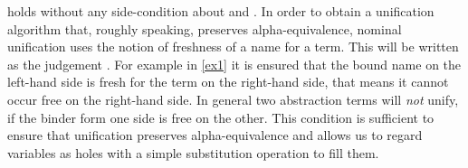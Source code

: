 \begin{isabellebody}
\begin{isamarkuptext}
  \noindent
  holds without any side-condition about  and . In order to 
  obtain a unification algorithm 
  that, roughly speaking, preserves alpha-equivalence,
  nominal unification uses the notion of freshness of a name for a term. This will be 
  written as the judgement . For example in
  \eqref{ex1} it is ensured that the bound name  
  on the left-hand side is fresh for the term on the right-hand side, that means it cannot occur free
  on the right-hand side. In general
  two abstraction terms will \emph{not} unify, if the binder form one side is free
  on the other. This condition is sufficient to ensure that unification preserves alpha-equivalence
  and allows us to regard variables as holes with a simple substitution operation to fill them.


\end{isamarkuptext}
\end{isabellebody}
